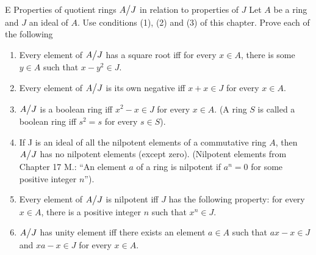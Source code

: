 \begin{exercise}{E Properties of quotient rings ${\textstyle A}\big/{\textstyle J}$ in relation to properties of $J$}
Let $A$ be a ring and $J$ an ideal of $A$. Use conditions (1), (2) and (3) of this chapter. Prove each of the following
  \begin{enumerate}
      \item Every element of ${\textstyle A}\big/{\textstyle J}$ has a square root iff for every $x\in A$, there is some $y\in A$ such that $x-y^{2}\in J$.
      \item Every element of ${\textstyle A}\big/{\textstyle J}$ is its own negative iff $x+x\in J$ for every $x\in A$.
      \item ${\textstyle A}\big/{\textstyle J}$ is a boolean ring iff $x^{2}-x\in J$ for every $x\in A$. (A ring $S$ is called a boolean ring iff $s^{2}=s$ for every $s\in S$).
      \item If J is an ideal of all the nilpotent elements of a commutative ring $A$, then ${\textstyle A}\big/{\textstyle J}$ has no nilpotent elements (except zero). (Nilpotent elements from Chapter 17 M.: ``An element $a$ of a ring is nilpotent if $a^{n}=0$ for some positive integer $n$'').
      \item Every element of ${\textstyle A}\big/{\textstyle J}$ is nilpotent iff $J$ has the following property: for every $x\in A$, there is a positive integer $n$ such that $x^{n}\in J$.
      \item ${\textstyle A}\big/{\textstyle J}$ has unity element iff there exists an element $a\in A$ such that $ax-x\in J$ and $xa-x\in J$ for every $x\in A$.
 \end{enumerate}
\end{exercise}
